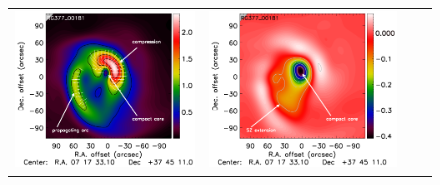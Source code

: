 \documentclass[twocolumn,traditabstract]{aa}
\begin{document}
\begin{figure}[h]
{\begin{tabular}{llll}
\includegraphics[trim=2.3cm 2.2cm 0cm 0cm, clip=true, scale=1]{Figure/Grad_RG377_00181_Ymap_zobs0p5_regrid_15_15_45.pdf} & 
\includegraphics[trim=2.3cm 2.2cm 0cm 0cm, clip=true, scale=1]{Figure/DoG_RG377_00181_Ymap_zobs0p5_regrid_15_15_45.pdf} \\

\end{tabular}}
\end{figure}
\end{document}
